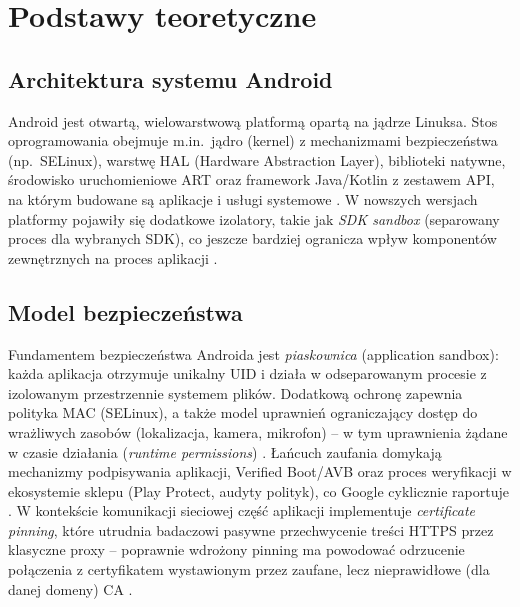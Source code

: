\chapter{Podstawy teoretyczne}

\section{Architektura systemu Android}
Android jest otwartą, wielowarstwową platformą opartą na jądrze Linuksa. Stos oprogramowania obejmuje m.in.\ jądro (kernel) z mechanizmami bezpieczeństwa (np.\ SELinux), warstwę HAL (Hardware Abstraction Layer), biblioteki natywne, środowisko uruchomieniowe ART oraz framework Java/Kotlin z zestawem API, na którym budowane są aplikacje i usługi systemowe \cite{AOSPArchitecture,AndroidPlatformArchitecture}. W nowszych wersjach platformy pojawiły się dodatkowe izolatory, takie jak \emph{SDK sandbox} (separowany proces dla wybranych SDK), co jeszcze bardziej ogranicza wpływ komponentów zewnętrznych na proces aplikacji \cite{SdkSandbox}.

\section{Model bezpieczeństwa}
Fundamentem bezpieczeństwa Androida jest \emph{piaskownica} (application sandbox): każda aplikacja otrzymuje unikalny UID i działa w odseparowanym procesie z izolowanym przestrzennie systemem plików. Dodatkową ochronę zapewnia polityka MAC (SELinux), a także model uprawnień ograniczający dostęp do wrażliwych zasobów (lokalizacja, kamera, mikrofon) – w tym uprawnienia żądane w czasie działania (\emph{runtime permissions}) \cite{AndroidSandbox,AndroidPermissionsOverview,AndroidPermissionRequest}. Łańcuch zaufania domykają mechanizmy podpisywania aplikacji, Verified Boot/AVB oraz proces weryfikacji w ekosystemie sklepu (Play Protect, audyty polityk), co Google cyklicznie raportuje \cite{GooglePlaySafety2024}. 
W kontekście komunikacji sieciowej część aplikacji implementuje \emph{certificate pinning}, które utrudnia badaczowi pasywne przechwycenie treści HTTPS przez klasyczne proxy – poprawnie wdrożony pinning ma powodować odrzucenie połączenia z certyfikatem wystawionym przez zaufane, lecz nieprawidłowe (dla danej domeny) CA \cite{OWASPMASTGPinning}.

